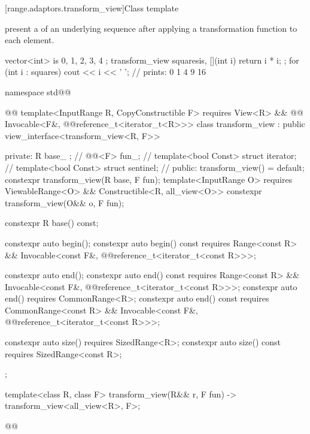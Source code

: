 [range.adaptors.transform_view]{Class template }

\pnum
{}   present
a  of an underlying sequence after
applying a transformation function to each element.

\pnum
\begin{example}
\begin{codeblock}
vector<int> is{ 0, 1, 2, 3, 4 };
transform_view squares{is, [](int i) { return i * i; }};
for (int i : squares)
  cout << i << ' '; // prints: 0 1 4 9 16
\end{codeblock}
\end{example}

\begin{codeblock}
namespace std@@ { @@
  template<InputRange R, CopyConstructible F>
    requires View<R> && @@ Invocable<F&, @@reference_t<iterator_t<R>>>
  class transform_view : public view_interface<transform_view<R, F>> {
  private:
    R base_ {}; // \expos
    @@<F> fun_; // \expos
    template<bool Const>
      struct iterator; // \expos
    template<bool Const>
      struct sentinel; // \expos
  public:
    transform_view() = default;
    constexpr transform_view(R base, F fun);
    template<InputRange O>
      requires ViewableRange<O> && Constructible<R, all_view<O>>
    constexpr transform_view(O&& o, F fun);

    constexpr R base() const;

    constexpr auto begin();
    constexpr auto begin() const requires Range<const R> &&
      Invocable<const F&, @@reference_t<iterator_t<const R>>>;

    constexpr auto end();
    constexpr auto end() const requires Range<const R> &&
      Invocable<const F&, @@reference_t<iterator_t<const R>>>;
    constexpr auto end() requires CommonRange<R>;
    constexpr auto end() const requires CommonRange<const R> &&
      Invocable<const F&, @@reference_t<iterator_t<const R>>>;

    constexpr auto size() requires SizedRange<R>;
    constexpr auto size() const requires SizedRange<const R>;
  };

  template<class R, class F>
  transform_view(R&& r, F fun) -> transform_view<all_view<R>, F>;
}@\oldtxt{\}}@
\end{codeblock}

